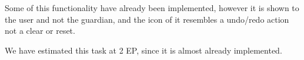 \begin{description}[style=unboxed]
    Some of this functionality have already been implemented, however it is shown to the user and not the guardian, and the icon of it resembles a undo/redo action not a clear or reset. 

    We have estimated this task at 2 EP, since it is almost already implemented. 
\end{description}
